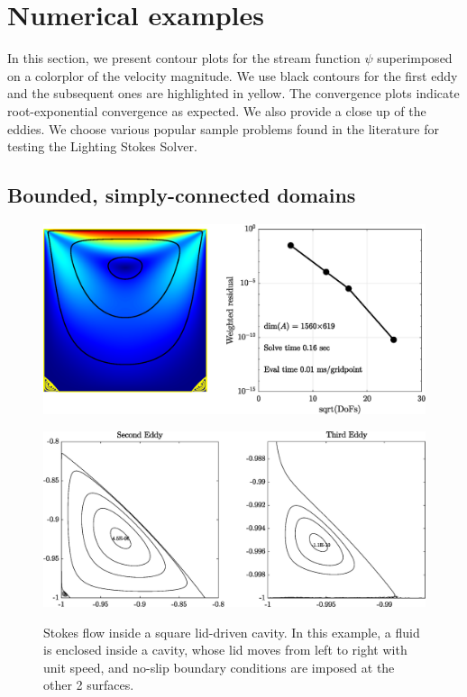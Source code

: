
\section{Numerical examples}
In this section, we present contour plots for the stream function $\psi$ superimposed on a colorplor of the velocity magnitude. We use black contours for the first eddy and the subsequent ones are highlighted in yellow. The convergence plots indicate root-exponential convergence as expected. We also provide a close up of the eddies. We choose various popular sample problems found in the literature for testing the Lighting Stokes Solver. 

\subsection{Bounded, simply-connected domains}

\begin{figure}[H]
	\centering
	\includegraphics[width=\linewidth]{Figures/ldc}
	
	\vspace{2em}
	\includegraphics[width=\linewidth]{Figures/ldc_eddy}
	\label{fig:ldc}
	\caption{Stokes flow inside a square lid-driven cavity. In this example, a fluid is enclosed inside a cavity, whose lid moves from left to right with unit speed, and no-slip boundary conditions are imposed at the other 2 surfaces.}
\end{figure} 

